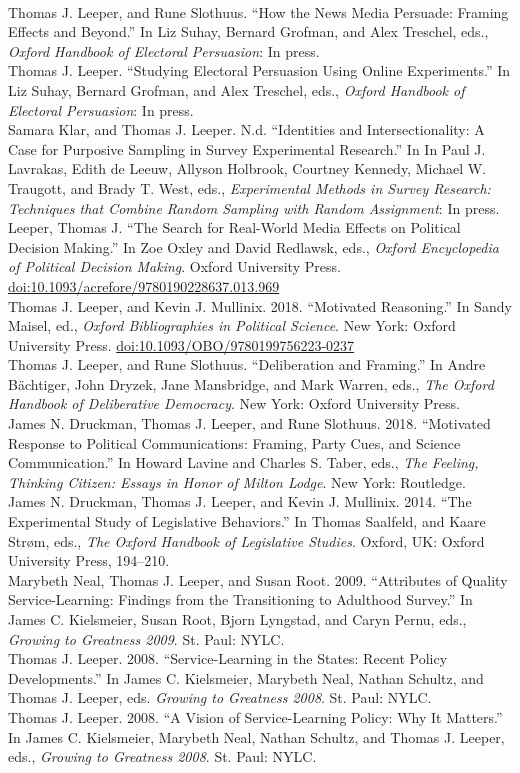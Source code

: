 \documentclass[12pt]{article}
\newcommand{\topic}[1]{\pagebreak[3]\indent {\color{lg}{\footnotesize #1 }}\\}
\newcommand{\entry}[1]{\indent {\color{lg}\guillemotright}\hspace{2pt}#1\vspace{.25em}\\}
\begin{document}
\topic{Chapters in Edited Volumes}
	\entry{Thomas J. Leeper, and Rune Slothuus. ``How the News Media Persuade: Framing Effects and Beyond.'' In Liz Suhay, Bernard Grofman, and Alex Treschel, eds., \textit{Oxford Handbook of Electoral Persuasion}: In press.}
    \entry{Thomas J. Leeper. ``Studying Electoral Persuasion Using Online Experiments.'' In Liz Suhay, Bernard Grofman, and Alex Treschel, eds., \textit{Oxford Handbook of Electoral Persuasion}: In press.}
   	\entry{Samara Klar, and Thomas J. Leeper. N.d. ``Identities and Intersectionality: A Case for Purposive Sampling in Survey Experimental Research.'' In  In Paul J. Lavrakas, Edith de Leeuw, Allyson Holbrook, Courtney Kennedy, Michael W. Traugott, and Brady T. West, eds., \textit{Experimental Methods in Survey Research: Techniques that Combine Random Sampling with Random Assignment}: In press.}
    \entry{Leeper, Thomas J. ``The Search for Real-World Media Effects on Political Decision Making.'' In Zoe Oxley and David Redlawsk, eds., \textit{Oxford Encyclopedia of Political Decision Making}. Oxford University Press. \href{https://doi.org/10.1093/acrefore/9780190228637.013.969}{doi:10.1093/acrefore/9780190228637.013.969}}    	
    \entry{Thomas J. Leeper, and Kevin J. Mullinix. 2018. ``Motivated Reasoning.'' In Sandy Maisel, ed., \textit{Oxford Bibliographies in Political Science}. New York: Oxford University Press. \href{https://doi.org/10.1093/OBO/9780199756223-0237}{doi:10.1093/OBO/9780199756223-0237}}
    \entry{Thomas J. Leeper, and Rune Slothuus. ``Deliberation and Framing.'' In Andre B{\"a}chtiger, John Dryzek, Jane Mansbridge, and Mark Warren, eds., \textit{The Oxford Handbook of Deliberative Democracy}. New York: Oxford University Press.}
	\entry{James N. Druckman, Thomas J. Leeper, and Rune Slothuus. 2018. ``Motivated Response to Political Communications: Framing, Party Cues, and Science Communication.'' In Howard Lavine and Charles S. Taber, eds., \textit{The Feeling, Thinking Citizen: Essays in Honor of Milton Lodge}. New York: Routledge.}
    \entry{James N. Druckman, Thomas J. Leeper, and Kevin J. Mullinix. 2014. ``The Experimental Study of Legislative Behaviors.'' In Thomas Saalfeld, and Kaare Str\o m, eds., \textit{The Oxford Handbook of Legislative Studies}. Oxford, UK: Oxford University Press, 194--210.}
	\entry{Marybeth Neal, Thomas J. Leeper, and Susan Root. 2009. ``Attributes of Quality Service-Learning: Findings from the Transitioning to Adulthood Survey.'' In James C. Kielsmeier, Susan Root, Bjorn Lyngstad, and Caryn Pernu, eds., \textit{Growing to Greatness 2009}. St. Paul: NYLC.}
	\entry{Thomas J. Leeper. 2008. ``Service-Learning in the States: Recent Policy Developments.'' In James C. Kielsmeier, Marybeth Neal, Nathan Schultz, and Thomas J. Leeper, eds. \textit{Growing to Greatness 2008}. St. Paul: NYLC.}
	\entry{Thomas J. Leeper. 2008. ``A Vision of Service-Learning Policy: Why It Matters.'' In James C. Kielsmeier, Marybeth Neal, Nathan Schultz, and Thomas J. Leeper, eds., \textit{Growing to Greatness 2008}. St. Paul: NYLC.}
\end{document}
